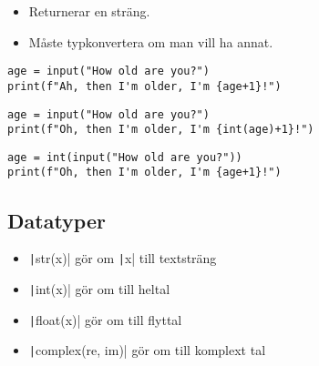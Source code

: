\begin{frame}
  \begin{remark}
    \begin{itemize}
      \item Returnerar en sträng.
      \item Måste typkonvertera om man vill ha annat.
    \end{itemize}
  \end{remark}
\end{frame}

\begin{frame}[fragile]
  \begin{example}
    \begin{verbatim}
age = input("How old are you?")
print(f"Ah, then I'm older, I'm {age+1}!")
    \end{verbatim}
  \end{example}

  \pause

  \begin{example}[Funkar]
    \begin{verbatim}
age = input("How old are you?")
print(f"Oh, then I'm older, I'm {int(age)+1}!")
    \end{verbatim}
  \end{example}

  \begin{example}[Funkar]
    \begin{verbatim}
age = int(input("How old are you?"))
print(f"Oh, then I'm older, I'm {age+1}!")
    \end{verbatim}
  \end{example}
\end{frame}

\subsection{Datatyper}

\begin{frame}
  \begin{remark}
    \begin{itemize}
      \item \texttt|str(x)| gör om \texttt|x| till textsträng
      \item \texttt|int(x)| gör om till heltal
      \item \texttt|float(x)| gör om till flyttal
      \item \texttt|complex(re, im)| gör om till komplext tal
    \end{itemize}
  \end{remark}
\end{frame}


